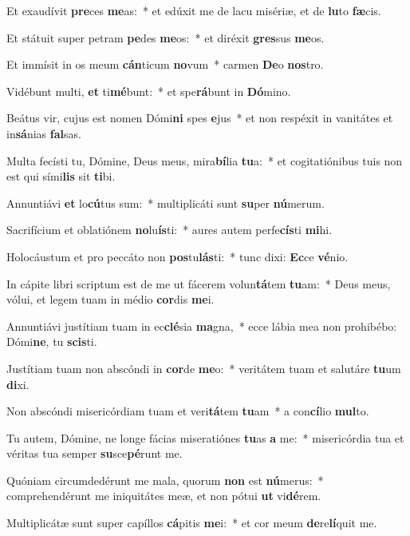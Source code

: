 \item Et exaudívit \textbf{pre}ces \textbf{me}as:~* et edúxit me de lacu misériæ, et de \textbf{lu}to \textbf{fæ}cis.
\item Et státuit super petram \textbf{pe}des \textbf{me}os:~* et diréxit \textbf{gres}sus \textbf{me}os.
\item Et immísit in os meum \textbf{cán}ticum \textbf{no}vum~* carmen \textbf{De}o \textbf{nos}tro.
\item Vidébunt multi, \textbf{et} ti\textbf{mé}bunt:~* et spe\textbf{rá}bunt in \textbf{Dó}mino.
\item Beátus vir, cujus est nomen Dómi\textbf{ni} spes \textbf{e}jus~* et non respéxit in vanitátes et in\textbf{sá}nias \textbf{fal}sas.
\item Multa fecísti tu, Dómine, Deus meus, mira\textbf{bí}lia \textbf{tu}a:~* et cogitatiónibus tuis non est qui sími\textbf{lis} sit \textbf{ti}bi.
\item Annuntiávi \textbf{et} lo\textbf{cú}tus sum:~* multiplicáti sunt \textbf{su}per \textbf{nú}merum.
\item Sacrifícium et oblatiónem \textbf{no}lu\textbf{ís}ti:~* aures autem perfe\textbf{cís}ti \textbf{mi}hi.
\item Holocáustum et pro peccáto non \textbf{pos}tu\textbf{lás}ti:~* tunc dixi: \textbf{Ec}ce \textbf{vé}nio.
\item In cápite libri scriptum est de me ut fácerem volun\textbf{tá}tem \textbf{tu}am:~* Deus meus, vólui, et legem tuam in médio \textbf{cor}dis \textbf{me}i.
\item Annuntiávi justítiam tuam in ec\textbf{clé}sia \textbf{ma}gna,~* ecce lábia mea non prohibébo: Dómi\textbf{ne}, tu \textbf{scis}ti.
\item Justítiam tuam non abscóndi in \textbf{cor}de \textbf{me}o:~* veritátem tuam et salutáre \textbf{tu}um \textbf{di}xi.
\item Non abscóndi misericórdiam tuam et veri\textbf{tá}tem \textbf{tu}am~* a con\textbf{cí}lio \textbf{mul}to.
\item Tu autem, Dómine, ne longe fácias miseratiónes \textbf{tu}as \textbf{a} me:~* misericórdia tua et véritas tua semper \textbf{su}sce\textbf{pé}runt me.
\item Quóniam circumdedérunt me mala, quorum \textbf{non} est \textbf{nú}merus:~* comprehendérunt me iniquitátes meæ, et non pótui \textbf{ut} vi\textbf{dé}rem.
\item Multiplicátæ sunt super capíllos \textbf{cá}pitis \textbf{me}i:~* et cor meum \textbf{de}re\textbf{lí}quit me.
